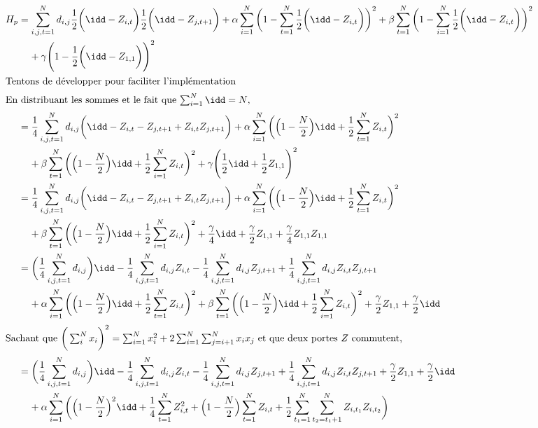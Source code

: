 \documentclass{article}
\begin{document}
\begin{align*}
    H_p&=\sum_{i,j,t=1}^N d_{i,j}\frac{1}{2}\bigg(\idd-Z_{i,t}\bigg)\frac{1}{2}\bigg(\idd-Z_{j,t+1}\bigg)+\alpha\sum_{i=1}^N\bigg(1-\sum_{t=1}^N \frac{1}{2}\bigg(\idd-Z_{i,t}\bigg)\bigg)^2+\beta\sum_{t=1}^N\bigg(1-\sum_{i=1}^N \frac{1}{2}\bigg(\idd-Z_{i,t}\bigg)\bigg)^2\\
    &\:\:\:\:\:+\gamma\Bigg(1-\frac{1}{2}\bigg(\idd-Z_{1,1}\bigg)\Bigg)^2\\
    \intertext{Tentons de développer pour faciliter l'implémentation}
    \intertext{En distribuant les sommes et le fait que $\sum_{i=1}^N\idd=N$,}
    &=\frac{1}{4}\sum_{i,j,t=1}^N d_{i,j}\bigg(\idd-Z_{i,t}-Z_{j,t+1}+Z_{i,t}Z_{j,t+1}\bigg)+\alpha\sum_{i=1}^N\bigg(\Big(1-\frac{N}{2}\Big)\idd+\frac{1}{2}\sum_{t=1}^N Z_{i,t}\bigg)^2\\
    &\:\:\:\:\:+\beta\sum_{t=1}^N\bigg(\Big(1-\frac{N}{2}\Big)\idd+\frac{1}{2}\sum_{i=1}^N Z_{i,t}\bigg)^2+\gamma\Bigg(\frac{1}{2}\idd +\frac{1}{2}Z_{1,1}\Bigg)^2\\
    &=\frac{1}{4}\sum_{i,j,t=1}^N d_{i,j}\bigg(\idd-Z_{i,t}-Z_{j,t+1}+Z_{i,t}Z_{j,t+1}\bigg)+\alpha\sum_{i=1}^N\bigg(\Big(1-\frac{N}{2}\Big)\idd+\frac{1}{2}\sum_{t=1}^N Z_{i,t}\bigg)^2\\
    &\:\:\:\:\:+\beta\sum_{t=1}^N\bigg(\Big(1-\frac{N}{2}\Big)\idd+\frac{1}{2}\sum_{i=1}^N Z_{i,t}\bigg)^2+\frac{\gamma}{4}\idd+\frac{\gamma}{2} Z_{1,1}+\frac{\gamma}{4}Z_{1,1}Z_{1,1}\\
    &=\bigg(\frac{1}{4}\sum_{i,j,t=1}^N d_{i,j}\bigg)\idd-\frac{1}{4}\sum_{i,j,t=1}^N d_{i,j}Z_{i,t}
    -\frac{1}{4}\sum_{i,j,t=1}^N d_{i,j}Z_{j,t+1}+\frac{1}{4}\sum_{i,j,t=1}^N d_{i,j}Z_{i,t}Z_{j,t+1}\\
    &\:\:\:\:\:+\alpha\sum_{i=1}^N\bigg(\Big(1-\frac{N}{2}\Big)\idd+\frac{1}{2}\sum_{t=1}^N Z_{i,t}\bigg)^2+\beta\sum_{t=1}^N\bigg(\Big(1-\frac{N}{2}\Big)\idd+\frac{1}{2}\sum_{i=1}^N Z_{i,t}\bigg)^2+\frac{\gamma}{2} Z_{1,1}+\frac{\gamma}{2}\idd\\
    \intertext{Sachant que $\bigg(\sum_i^Nx_i\bigg)^2=\sum_{i=1}^Nx_i^2+2\sum_{i=1}^N\sum_{j=i+1}^Nx_ix_j$ et que deux portes $Z$ commutent,}
    &=\bigg(\frac{1}{4}\sum_{i,j,t=1}^N d_{i,j}\bigg)\idd-\frac{1}{4}\sum_{i,j,t=1}^N d_{i,j}Z_{i,t}
    -\frac{1}{4}\sum_{i,j,t=1}^N d_{i,j}Z_{j,t+1}+\frac{1}{4}\sum_{i,j,t=1}^N d_{i,j}Z_{i,t}Z_{j,t+1}+\frac{\gamma}{2} Z_{1,1}+\frac{\gamma}{2}\idd\\
    &\:\:\:\:\:+\alpha\sum_{i=1}^N\bigg(\Big(1-\frac{N}{2}\Big)^2\idd+\frac{1}{4}\sum_{t=1}^NZ_{i,t}^2+\Big(1-\frac{N}{2}\Big)\sum_{t=1}^NZ_{i,t}+\frac{1}{2}\sum_{t_1=1}^N\sum_{t_2=t_1+1}^NZ_{i,t_1}Z_{i,t_2}\bigg)\\

\end{align*}
\end{document}
